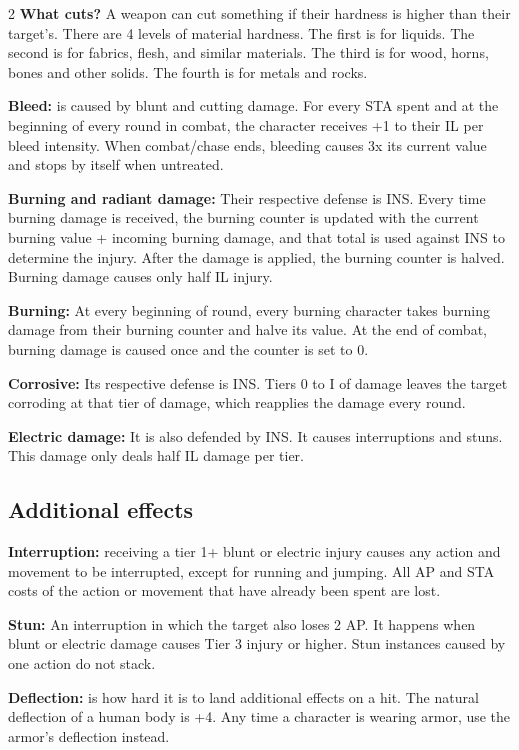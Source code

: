 \begin{multicols}{2}
\textbf{What cuts?} A weapon can cut something if their hardness is higher than their target's. There are 4 levels of material hardness. The first is for liquids. The second is for fabrics, flesh, and similar materials. The third is for wood, horns, bones and other solids. The fourth is for metals and rocks.

\textbf{Bleed:} is caused by blunt and cutting damage. For every STA spent and at the beginning of every round in combat, the character receives +1 to their IL per bleed intensity. When combat/chase ends, bleeding causes 3x its current value and stops by itself when untreated.

\textbf{Burning and radiant damage:} Their respective defense is INS. Every time burning damage is received, the burning counter is updated with the current burning value + incoming burning damage, and that total is used against INS to determine the injury. After the damage is applied, the burning counter is halved. Burning damage causes only half IL injury.

\textbf{Burning: } At every beginning of round, every burning character takes burning damage from their burning counter and halve its value. At the end of combat, burning damage is caused once and the counter is set to 0.

\textbf{Corrosive:} Its respective defense is INS. Tiers 0 to I of damage leaves the target corroding at that tier of damage, which reapplies the damage every round.

\textbf{Electric damage:} It is also defended by INS. It causes interruptions and stuns. This damage only deals half IL damage per tier.

\subsection{Additional effects}

\textbf{Interruption:} receiving a tier 1+ blunt or electric injury causes any action and movement to be interrupted, except for running and jumping. All AP and STA costs of the action or movement that have already been spent are lost. 

\textbf{Stun:} An interruption in which the target also loses 2 AP. It happens when blunt or electric damage causes Tier 3 injury or higher. Stun instances caused by one action do not stack.

\textbf{Deflection:} is how hard it is to land additional effects on a hit. The natural deflection of a human body is +4. Any time a character is wearing armor, use the armor's deflection instead. 


\end{multicols}

